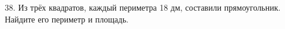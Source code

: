 38. Из трёх квадратов, каждый периметра 18 дм, составили прямоугольник. Найдите его периметр и площадь.\\
